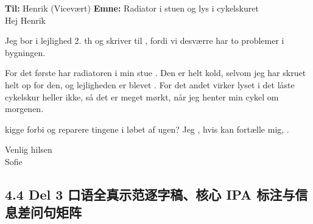 \begin{tcolorbox}[enhanced, colback=NCDBgGray, colframe=NCDGray, coltitle=white, fonttitle=\bfseries, title={Bonus Opgave 1B 示范：致物业 Henrik 的礼貌半正式报修信（共 102 词）}, arc=2pt, boxrule=0.8pt, borderline west={3pt}{0pt}{NCDRed}, left=10pt, right=10pt, top=7pt, bottom=7pt]
\textbf{Til:} Henrik (Vicevært) \qquad \textbf{Emne:} Radiator i stuen og lys i cykelskuret\\[4pt]
Hej Henrik

Jeg bor i lejlighed 2. th og skriver til , fordi vi desværre har to problemer i bygningen.

For det første har radiatoren i min stue . Den er helt kold, selvom jeg har skruet helt op for den, og lejligheden er blevet . For det andet virker lyset i det låste cykelskur heller ikke, så det er meget mørkt, når jeg henter min cykel om morgenen.

 kigge forbi og reparere tingene i løbet af ugen? Jeg , hvis  kan fortælle mig, .

Venlig hilsen\\
Sofie
\end{tcolorbox}

\subsection*{4.4 Del 3 口语全真示范逐字稿、核心 IPA 标注与信息差问句矩阵}

